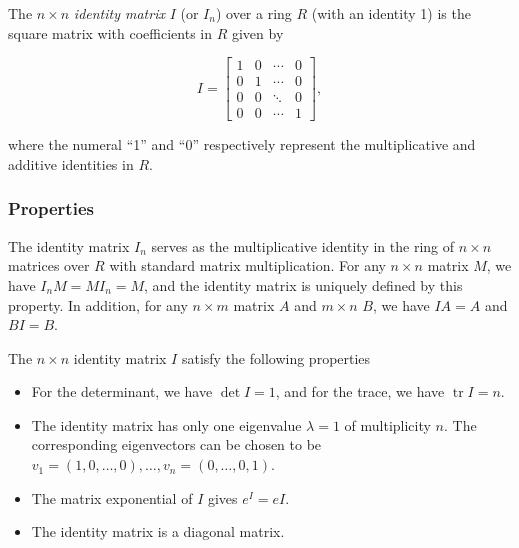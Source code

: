 \documentclass{article}
\begin{document}
The $n \times n$ \emph{identity matrix} $I$ (or $I_n$) over a ring $R$ (with an identity 1) is the square matrix with coefficients in $R$ given by

$$ I = 
\begin{bmatrix}
1 & 0 & \cdots & 0 \\
0 & 1 & \cdots & 0 \\
0 & 0 & \ddots & 0 \\
0 & 0 & \cdots & 1
\end{bmatrix},$$

where the numeral ``1'' and ``0'' respectively represent the multiplicative and additive identities in $R$.  

\subsubsection{Properties}
The identity matrix $I_n$ serves as the multiplicative identity in the ring of $n\times n$ matrices over $R$ with standard matrix multiplication.  For any $n\times n$ matrix $M$, we have $I_nM=MI_n=M$, and the identity matrix is uniquely defined by this property.  In addition, for any $n\times m$ matrix $A$ and $m\times n$ $B$, we have $IA=A$ and $BI=B$.

The $n\times n$ identity matrix  $I$ satisfy the following properties
\begin{itemize}
\item For the determinant, we have $\det I = 1$, and for the trace, we have
$\operatorname{tr}I = n$. 
\item The identity matrix has only one eigenvalue $\lambda =1$ of
multiplicity $n$. The corresponding eigenvectors can be chosen to be 
$v_1=(1,0,\ldots, 0),\ldots, v_n=(0,\ldots, 0,1)$. 
\item The matrix exponential of $I$ gives $e^I = e I$. 
\item The identity matrix is a diagonal matrix. 
\end{itemize}
\end{document}
